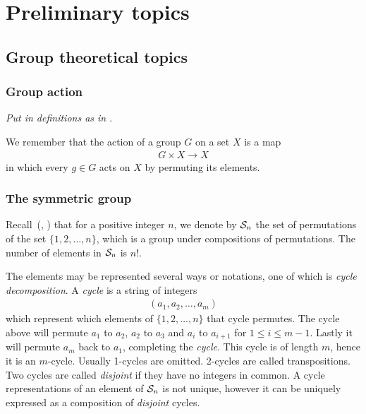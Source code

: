 \clearpage{\thispagestyle{empty}}
\section{Preliminary topics}

\subsection{Group theoretical topics}

\subsubsection{Group action}

\textit{Put in definitions as in \cite{DummitFoote}}.

We remember that the action of a group $G$ on a set $X$ is a map
\begin{align*}
	G \times X \rightarrow X
\end{align*}
in which every $g \in G$ acts on $X$ by permuting its elements.

%

\subsubsection{The symmetric group}

Recall~(\cite[1.3.]{DummitFoote}, \cite[1.1]{Sagan}) that for a positive integer $n$, we denote by $\mathcal{S}_n$ the set of permutations of the set $\{1, 2, \dots, n\}$, which is a group under compositions of permutations. The number of elements in $\mathcal{S}_n$ is $n!$.

The elements may be represented several ways or notations, one of which is \textit{cycle decomposition}. A \textit{cycle} is a string of integers \begin{align*}
	(a_1, a_2, \dots, a_m)
\end{align*} which represent which elements of $\{1,2, \dots, n\}$ that cycle permutes. The cycle above will permute $a_1$ to $a_2$, $a_2$ to $a_3$ and $a_{i}$ to $a_{i+1}$ for $1 \leq i \leq m-1$. Lastly it will permute $a_m$ back to $a_1$, completing the \textit{cycle}. This cycle is of length $m$, hence it is an $m$-cycle. Usually 1-cycles are omitted. 2-cycles are called transpositions. Two cycles are called \textit{disjoint} if they have no integers in common. A cycle representations of an element of $\mathcal{S}_n$ is not unique, however it can be uniquely expressed as a composition of \textit{disjoint} cycles.

